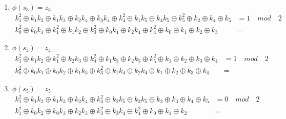 \documentclass[11pt]{article}
\begin{document}
\begin{enumerate}
\item $\phi(s_3) = z_3$
\begin{equation}
\begin{align}
k_1^2 \oplus k_1k_2 \oplus k_1k_3 \oplus k_2k_4 \oplus k_3k_4 \oplus k_4^2 \oplus k_1k_5 \oplus k_4k_5 \oplus k_5^2 \oplus k_2 \oplus k_4 \oplus k_5&= 1 \quad mod \quad 2 \\
k_0^2 \oplus k_0k_1 \oplus k_1^2 \oplus k_1k_2 \oplus k_3^2 \oplus k_0k_4 \oplus k_2k_4 \oplus k_4^2 \oplus k_0 \oplus k_1 \oplus k_2 \oplus k_3&=
\end{align}
\label{eq_2_34}
\end{equation}



\item $\phi(s_4) = z_4$
\begin{equation}
\begin{align}
k_1^2 \oplus k_1k_2 \oplus k_1^2 \oplus k_2k_3 \oplus k_4^2 \oplus k_1k_5 \oplus k_2k_5 \oplus k_5^2 \oplus k_1 \oplus k_2 \oplus k_3 \oplus k_4 &= 1 \quad mod \quad 2 \\
k_0^2 \oplus k_0k_1 \oplus k_0k_2 \oplus k_1k_3 \oplus k_3^2 \oplus k_1k_4 \oplus k_2k_4 \oplus k_1 \oplus k_2 \oplus k_3 \oplus k_4&=
\end{align}
\label{eq_2_35}
\end{equation}



\item $\phi(s_5) = z_5$
\begin{equation}
\begin{align}
k_1^2 \oplus k_1k_2 \oplus k_1k_3 \oplus k_2k_4 \oplus k_4^2 \oplus k_2k_5 \oplus k_3k_5 \oplus k_2 \oplus k_3 \oplus k_4 \oplus k_5 &= 0 \quad mod \quad 2 \\
k_1^2 \oplus k_0k_2 \oplus k_0k_3 \oplus k_2k_3 \oplus k_3^2 \oplus k_3k_4 \oplus k_4^2 \oplus k_0 \oplus k_1 \oplus k_2&=
\end{align}
\label{eq_2_36}
\end{equation}
\end{enumerate}

\end{document}

